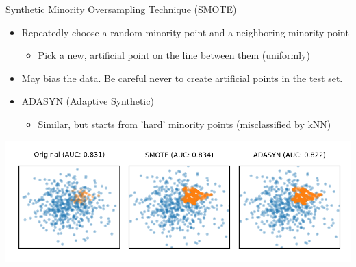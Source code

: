 \begin{frame}[allowframebreaks]{Synthetic Minority Oversampling Technique (SMOTE)}
\begin{itemize}
    \item Repeatedly choose a random minority point and a neighboring minority point
    \begin{itemize}
        \item Pick a new, artificial point on the line between them (uniformly)
    \end{itemize}
    \item May bias the data. Be careful never to create artificial points in the test set.
    \item ADASYN (Adaptive Synthetic)
    \begin{itemize}
        \item Similar, but starts from 'hard' minority points (misclassified by kNN)
    \end{itemize}
\end{itemize}

\begin{center}
    \includegraphics[width=0.85\linewidth]{images/pre-processing/smote}
\end{center}
\end{frame}


